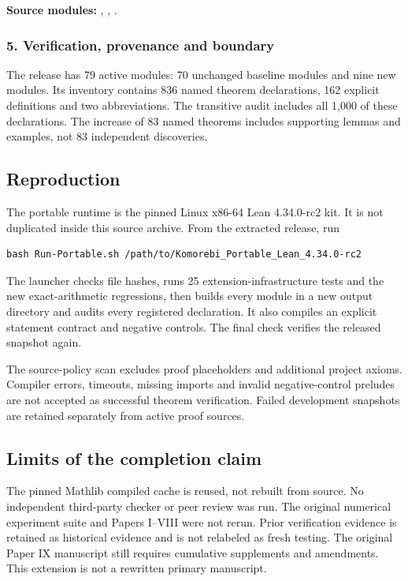 \textbf{Source modules:} , , .

\par\medskip
\subsubsection*{5. Verification, provenance and boundary}
The release has 79 active modules: 70 unchanged baseline modules and nine new modules. Its inventory contains 836 named theorem declarations, 162 explicit definitions and two abbreviations. The transitive audit includes all 1,000 of these declarations. The increase of 83 named theorems includes supporting lemmas and examples, not 83 independent discoveries.



\subsection*{Reproduction}
The portable runtime is the pinned Linux x86-64 Lean 4.34.0-rc2 kit. It is not duplicated inside this source archive. From the extracted release, run
\begin{verbatim}
bash Run-Portable.sh /path/to/Komorebi_Portable_Lean_4.34.0-rc2
\end{verbatim}
The launcher checks file hashes, runs 25 extension-infrastructure tests and the new exact-arithmetic regressions, then builds every module in a new output directory and audits every registered declaration. It also compiles an explicit statement contract and negative controls. The final check verifies the released snapshot again.

The source-policy scan excludes proof placeholders and additional project axioms. Compiler errors, timeouts, missing imports and invalid negative-control preludes are not accepted as successful theorem verification. Failed development snapshots are retained separately from active proof sources.

\subsection*{Limits of the completion claim}
The pinned Mathlib compiled cache is reused, not rebuilt from source. No independent third-party checker or peer review was run. The original numerical experiment suite and Papers I--VIII were not rerun. Prior verification evidence is retained as historical evidence and is not relabeled as fresh testing. The original Paper IX manuscript still requires cumulative supplements and amendments. This extension is not a rewritten primary manuscript.

